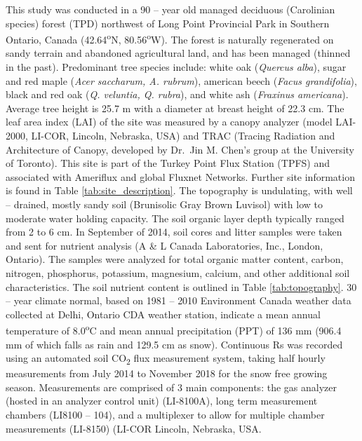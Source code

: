 \documentclass[]{elsarticle} %
\begin{document}
This study was conducted in a 90 -- year old managed deciduous
(Carolinian species) forest (TPD) northwest of Long Point Provincial
Park in Southern Ontario, Canada (42.64\textsuperscript{o}N,
80.56\textsuperscript{o}W). The forest is naturally regenerated on sandy
terrain and abandoned agricultural land, and has been managed (thinned
in the past). Predominant tree species include: white oak
(\textit{Quercus alba}), sugar and red maple
(\textit{Acer saccharum, A. rubrum}), american beech
(\textit{Facus grandifolia}), black and red oak
(\textit{Q. veluntia, Q. rubra}), and white ash
(\textit{Fraxinus americana}). Average tree height is 25.7 m with a
diameter at breast height of 22.3 cm. The leaf area index (LAI) of the
site was measured by a canopy analyzer (model LAI-2000, LI-COR, Lincoln,
Nebraska, USA) and TRAC (Tracing Radiation and Architecture of Canopy,
developed by Dr.~Jin M. Chen's group at the University of Toronto). This
site is part of the Turkey Point Flux Station (TPFS) and associated with
Ameriflux and global Fluxnet Networks. Further site information is found
in Table \ref{tab:site_description}. \newline \newline The topography is
undulating, with well -- drained, mostly sandy soil (Brunisolic Gray
Brown Luvisol) with low to moderate water holding capacity. The soil
organic layer depth typically ranged from 2 to 6 cm. In September of
2014, soil cores and litter samples were taken and sent for nutrient
analysis (A \& L Canada Laboratories, Inc., London, Ontario). The
samples were analyzed for total organic matter content, carbon,
nitrogen, phosphorus, potassium, magnesium, calcium, and other
additional soil characteristics. The soil nutrient content is outlined
in Table \ref{tab:topography}. 30 -- year climate normal, based on 1981
-- 2010 Environment Canada weather data collected at Delhi, Ontario CDA
weather station, indicate a mean annual temperature of
8.0\textsuperscript{o}C and mean annual precipitation (PPT) of 136 mm
(906.4 mm of which falls as rain and 129.5 cm as snow). \newline
\newline Continuous Rs was recorded using an automated soil
CO\textsubscript{2} flux measurement system, taking half hourly
measurements from July 2014 to November 2018 for the snow free growing
season. Measurements are comprised of 3 main components: the gas
analyzer (hosted in an analyzer control unit) (LI-8100A), long term
measurement chambers (LI8100 -- 104), and a multiplexer to allow for
multiple chamber measurements (LI-8150) (LI-COR Lincoln, Nebraska, USA.
\end{document}
